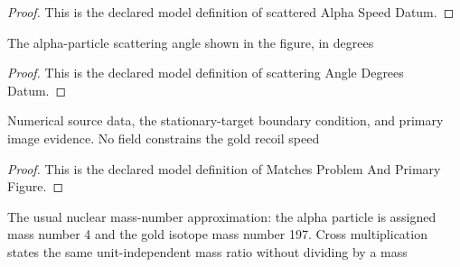\begin{proof}
  This is the declared model definition of scattered Alpha Speed Datum.
\end{proof}
\begin{definition}
  \label{def:physics:phyx-mini-0497:phyxminiproblems-problemphyxmini0497-scatteringangledegreesdatum}
  The alpha-particle scattering angle shown in the figure, in degrees
\end{definition}
\begin{proof}
  This is the declared model definition of scattering Angle Degrees Datum.
\end{proof}
\begin{definition}
  \label{def:physics:phyx-mini-0497:phyxminiproblems-problemphyxmini0497-matchesproblemandprimaryfigure}
  Numerical source data, the stationary-target boundary condition, and primary image evidence. No field constrains the gold recoil speed
\end{definition}
\begin{proof}
  This is the declared model definition of Matches Problem And Primary Figure.
\end{proof}
\begin{definition}
  \label{def:physics:phyx-mini-0497:phyxminiproblems-problemphyxmini0497-satisfiesmassnumberapproximation}
  The usual nuclear mass-number approximation: the alpha particle is assigned mass number 4 and the gold isotope mass number 197. Cross multiplication states the same unit-independent mass ratio without dividing by a mass
\end{definition}
